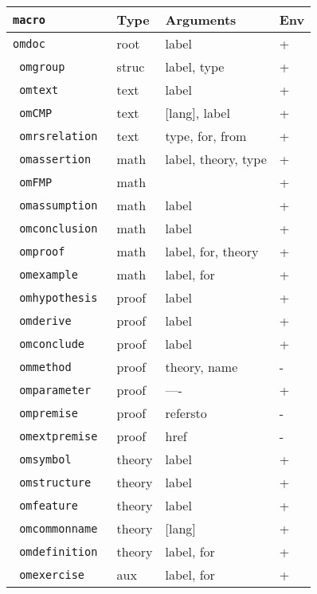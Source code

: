 \documentclass{article}
\begin{document}
\begin{figure}[htbp]
\begin{center}
\begin{tabular}{|>{\tt}l|l|l|l|}\hline
{\rm macro}   & Type   & Arguments           & Env \\\hline\hline
 omdoc        & root   & label               & + \\\hline
 omgroup      & struc  & label, type         & + \\\hline
 omtext       & text   & label               & + \\\hline
 omCMP        & text   & [lang], label       & + \\\hline
 omrsrelation & text   & type, for, from     & + \\\hline\hline
 omassertion  & math   & label, theory, type & + \\\hline
 omFMP        & math   &                     & + \\\hline
 omassumption & math   & label               & + \\\hline
 omconclusion & math   & label               & + \\\hline
 omproof      & math   & label, for, theory  & + \\\hline
 omexample    & math   & label, for          & + \\\hline\hline
 omhypothesis & proof  & label               & + \\\hline
 omderive     & proof  & label               & + \\\hline
 omconclude   & proof  & label               & + \\\hline
 ommethod     & proof  & theory, name        & - \\\hline
 omparameter  & proof  & ----                & + \\\hline
 ompremise    & proof  & refersto            & - \\\hline
 omextpremise & proof  & href                & - \\\hline\hline
 omsymbol     & theory & label               & + \\\hline
 omstructure  & theory & label               & + \\\hline
 omfeature    & theory & label               & + \\\hline
 omcommonname & theory & [lang]              & + \\\hline
 omdefinition & theory & label, for          & + \\\hline\hline
 omexercise   & aux    & label, for          & + \\

\end{tabular}
\end{center}
\end{figure}
\end{document}
